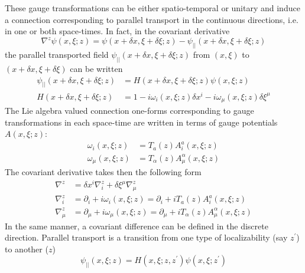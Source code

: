 \documentclass[12pt,a4paper]{article}
\begin{document}
These gauge transformations can be either spatio-temporal or unitary and
induce a connection corresponding to parallel transport in the continuous
directions, i.e. in one or both space-times. In fact, in the covariant
derivative\cite{Kubo 1998}
\begin{equation}
\nabla^{z}\psi\left(  x,\xi;z\right)  =\psi\left(  x+\delta x,\xi+\delta
\xi;z\right)  -\psi_{||}\left(  x+\delta x,\xi+\delta\xi;z\right)
\end{equation}
the parallel transported field $\psi_{||}\left(  x+\delta x,\xi+\delta
\xi;z\right)  $ from $\left(  x,\xi\right)  $ to $\left(  x+\delta
x,\xi+\delta\xi\right)  $ can be written
\begin{align}
\psi_{||}\left(  x+\delta x,\xi+\delta\xi;z\right)   & =H\left(  x+\delta
x,\xi+\delta\xi;z\right)  \psi\left(  x,\xi;z\right) \\
H\left(  x+\delta x,\xi+\delta\xi;z\right)   & =1-i\omega_{i}\left(
x,\xi;z\right)  \delta x^{i}-i\omega_{\mu}\left(  x,\xi;z\right)  \delta
\xi^{\mu}\label{HCI}%
\end{align}
The Lie algebra valued connection one-forms corresponding to gauge
transformations in each space-time are written in terms of gauge potentials
$A\left(  x,\xi;z\right)  $:
\begin{align}
\omega_{i}\left(  x,\xi;z\right)   & =T_{a}\left(  z\right)  A_{i}^{a}\left(
x,\xi;z\right) \\
\omega_{\mu}\left(  x,\xi;z\right)   & =T_{\alpha}\left(  z\right)  A_{\mu
}^{\alpha}\left(  x,\xi;z\right)
\end{align}
The covariant derivative takes then the following form
\begin{align}
\nabla^{z}  & =\delta x^{i}\nabla_{i}^{z}+\delta\xi^{\mu}\nabla_{\mu}^{z}\\
\nabla_{i}^{z}  & =\partial_{i}+i\omega_{i}\left(  x,\xi;z\right)
=\partial_{i}+iT_{a}\left(  z\right)  A_{i}^{a}\left(  x,\xi;z\right) \\
\nabla_{\mu}^{z}  & =\partial_{\mu}+i\omega_{\mu}\left(  x,\xi;z\right)
=\partial_{\mu}+iT_{\alpha}\left(  z\right)  A_{\mu}^{\alpha}\left(
x,\xi;z\right)
\end{align}
In the same manner, a covariant difference can be defined in the discrete
direction. Parallel transport is a transition from one type of localizability
(say $z^{\prime}$) to another ($z$)
\begin{equation}
\psi_{||}\left(  x,\xi;z\right)  =H\left(  x,\xi;z,z^{\prime}\right)
\psi\left(  x,\xi;z^{\prime}\right)
\end{equation}
\end{document}
